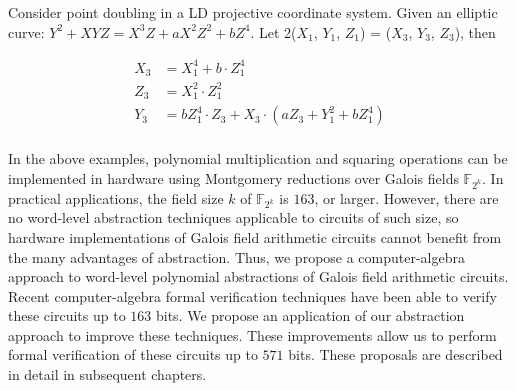 \begin{Example}
Consider point doubling in a LD projective coordinate system. 
Given an elliptic curve: $Y^2 + XYZ = X^3Z + aX^2Z^2 + bZ^4$. 
Let 2($X_1$, $Y_1$, $Z_1$) = ($X_3$, $Y_3$, $Z_3$), then

\begin{align*}
X_3 &= X_1^4 + b \cdot Z_1^4  \\
Z_3 &= X_1^2 \cdot Z_1^2 \\
Y_3 &= b Z_1^4 \cdot Z_3 + X_3 \cdot (aZ_3 + Y_1^2 + bZ_1^4 ) \\
\end{align*}
\end{Example}

In the above examples, polynomial multiplication and squaring operations can be 
implemented in hardware using Montgomery reductions over Galois fields $\mathbb{F}_
{2^k}$. In practical applications, the field size $k$ of $\mathbb{F}_{2^k}$ is $163$,
or larger. However, there are no word-level 
abstraction techniques applicable to circuits of such size, so hardware 
implementations of Galois field arithmetic circuits 
cannot benefit from the many advantages of abstraction.
Thus, we propose a computer-algebra approach to word-level polynomial abstractions 
of Galois field arithmetic circuits.
Recent computer-algebra formal verification techniques \cite{lv:phd} 
have been able to verify these circuits up to $163$ bits. 
We propose an application of our abstraction approach to improve these techniques. 
These improvements allow us to perform formal verification of these
circuits up to $571$ bits. These proposals are described in detail in 
subsequent chapters.
